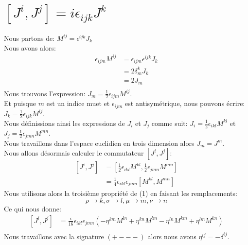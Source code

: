 \documentclass[12pt, a4paper]{article}
\begin{document}
 \section{\([J^{i},J^{j}]=i\epsilon_{ijk}J^{k}\)}
 Nous partons de: \(M^{ij}=\epsilon^{ijk}J_{k}\)\\
 Nous avons alors: 
 \begin{equation}
 	\begin{split}
 		\epsilon_{ijm}M^{ij}
 		&=\epsilon_{ijm} \epsilon^{ijk} J_{k}\\
 		&=2\delta^{k}_{m} J_{k}\\
 		&=2 J_{m}\\
 	\end{split}
 \end{equation}
 Nous trouvons l'expression: \(J_{m}=\frac{1}{2}\epsilon_{ijm}M^{ij}\).\\
 Et puisque \(m\) est un indice muet et \(\epsilon_{ijm}\) est antisymétrique, nous pouvons écrire: \(J_{k}=\frac{1}{2}\epsilon_{ijk}M^{ij}\).\\
 Nous définissions ainsi les expressions de \(J_{i}\) et \(J_{j}\) comme suit:
 \(J_{i}=\frac{1}{2}\epsilon_{ikl}M^{kl}\) et 
 \(J_{j}=\frac{1}{2}\epsilon_{jmn}M^{mn}\).\\
 Nous travaillons dans l'espace euclidien en trois dimension alors \(J_{m}=J^{m}\).\\
 Nous allons désormais calculer le commutateur \([J^{i},J^{j}]\):
 \begin{equation}
 	\begin{split}
 		[J^{i},J^{j}]
 		&=[\frac{1}{2}\epsilon_{ikl}M^{kl},\frac{1}{2}\epsilon_{jmn}M^{mn}]\\
 		&=\frac{1}{4}\epsilon_{ikl}\epsilon_{jmn}[M^{kl},M^{mn}]
 	\end{split}
 \end{equation}
 Nous utilisons alors la troisième propriété de (1) en faisant les remplacements:
 \begin{equation}
 	\rho\rightarrow k, \sigma\rightarrow l, \mu\rightarrow m, \nu\rightarrow n
 \end{equation}
 Ce qui nous donne:
 \begin{equation}
 	\begin{split}
 		[J^{i},J^{j}]
 		&=\frac{i}{16}\epsilon_{ikl}\epsilon_{jmn} (
 		-\eta^{k m}M^{l n} + \eta^{k n}M^{l m} -\eta^{l n}M^{k m} + \eta^{l m}M^{k n})\\
 	\end{split}
 \end{equation}
 Nous travaillons avec la signature \((+---)\) alors nous avons \( \eta^{ij}=-\delta^{ij}\).\\
\end{document}
